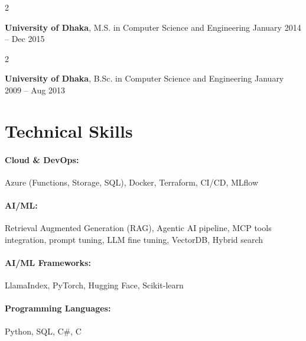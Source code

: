\documentclass[10pt, letterpaper]{article}
\newenvironment{twocolentry}[2][]{
    \onecolentry
    \def\secondColumn{#2}
    \setcolumnwidth{\fill, 4.5 cm}
    \begin{paracol}{2}
}{
    \switchcolumn \raggedleft \secondColumn
    \end{paracol}
    \endonecolentry
} %
\begin{document}
        \begin{twocolentry}{
            January 2014 – Dec 2015
        }
            \textbf{University of Dhaka}, M.S. in Computer Science and Engineering\end{twocolentry}

        \begin{twocolentry}{
            January 2009 – Aug 2013
        }
            \textbf{University of Dhaka}, B.Sc. in Computer Science and Engineering\end{twocolentry}

\vspace{-1mm}
\section{Technical Skills}

        \paragraph{Cloud \& DevOps:} Azure (Functions, Storage, SQL), Docker, Terraform, CI/CD, MLflow
        \vspace{-4mm}
        \paragraph{AI/ML:} Retrieval Augmented Generation (RAG), Agentic AI pipeline, MCP tools integration, prompt tuning, LLM fine tuning, VectorDB, Hybrid search
        \vspace{-4mm}
        \paragraph{AI/ML Frameworks:} LlamaIndex, PyTorch, Hugging Face, Scikit-learn
        \vspace{-4mm}
        \paragraph{Programming Languages:} Python, SQL, C\#, C
\end{document}
